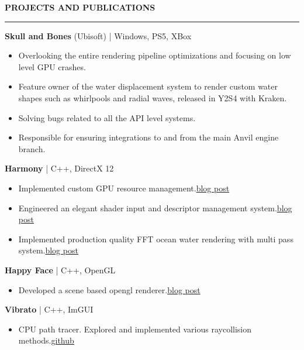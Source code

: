 \documentclass[a4paper, 11pt]{article}
\newenvironment{resumeSection}[1]
{
    \MakeUppercase{\Large\textbf{#1}}
    \medskip
    \hrule
    \begin{list}{}
    {
        \setlength\itemsep{-0.3em}
        \setlength\leftmargin{0em}
    }
    \vspace{-1em}
    \item[]
}
{   \end{list}  }
\newenvironment{sectionItems}
{
    \vspace{-0.5em}
    \begin{itemize}
    \setlength{\itemsep}{-0.7em}
}
{
    \end{itemize}
}
\begin{document}
\medskip
\begin{resumeSection}{Projects and Publications}
    \item \textbf{Skull and Bones} (Ubisoft) | {Windows, PS5, XBox}
    \begin{sectionItems}
        \setlength\itemsep{-0.5em}
        \item Overlooking the entire rendering pipeline optimizations and focusing on low level GPU crashes.
        \item Feature owner of the water displacement system to render custom water shapes such as whirlpools and radial waves, released in Y2S4 with Kraken.
        \item Solving bugs related to all the API level systems.
        \item Responsible for ensuring integrations to and from the main Anvil engine branch.
    \end{sectionItems}
    
    \item \textbf{Harmony} | {C++, DirectX 12}
    \begin{sectionItems}
        \setlength\itemsep{-0.5em}
        \item Implemented custom GPU resource management.\hfill \href{https://jaynakum.github.io/blog/7/GPUMemoryManagement}{blog post}
        \item Engineered an elegant shader input and descriptor management system.\hfill \href{https://jaynakum.github.io/blog/8/GPUResourceDescriptors}{blog post}
        \item Implemented production quality FFT ocean water rendering with multi pass system.\hfill \href{https://jaynakum.github.io/blog/6/OceanRendering}{blog post}
    \end{sectionItems}

    \item \textbf{Happy Face} | {C++, OpenGL}
    \begin{sectionItems}
        \setlength\itemsep{-0.5em}
        \item Developed a scene based opengl renderer.\hfill \href{https://jaynakum.github.io/blog/1/HappyFace}{blog post}
    \end{sectionItems}

    \item \textbf{Vibrato} | {C++, ImGUI}
    \begin{sectionItems}
        \setlength\itemsep{-0.5em}
        \item CPU path tracer. Explored and implemented various raycollision methods.\hfill \href{https://github.com/JayNakum/Vibrato}{github}
    \end{sectionItems}


\end{resumeSection}
\end{document}
